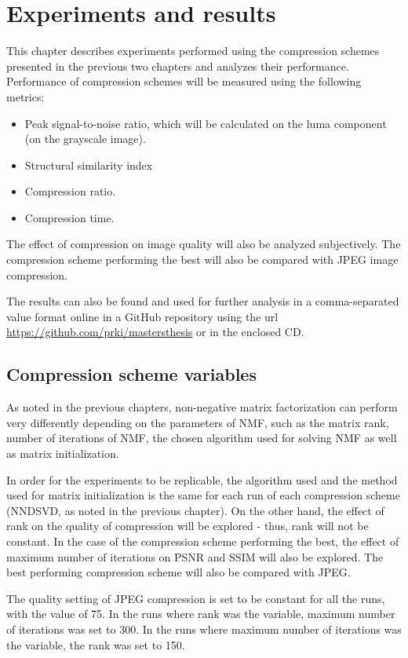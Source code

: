\documentclass[thesis=M,english]{FITthesis}[2012/10/20]
\begin{document}
\chapter{Experiments and results}
\label{ch:tests}
This chapter describes experiments performed using the compression schemes
presented in the previous two chapters and analyzes their performance. Performance of
compression schemes will be measured using the following metrics:
\begin{itemize}
  \item Peak signal-to-noise ratio, which will be calculated on the luma component
  (on the grayscale image).
  \item Structural similarity index
  \item Compression ratio.
  \item Compression time.
\end{itemize}
The effect of compression on image quality will also be analyzed subjectively.
The compression scheme performing the best will also be compared with JPEG image
compression.

The results can also be found and used for further analysis in a comma-separated
value format online in a GitHub repository using the url \url{https://github.com/prki/mastersthesis}
or in the enclosed CD.


\section{Compression scheme variables}
As noted in the previous chapters, non-negative matrix factorization can perform
very differently depending on the parameters of NMF, such as the matrix rank,
number of iterations of NMF, the chosen algorithm used for solving NMF as well
as matrix initialization.

In order for the experiments to be replicable, the algorithm used and the
method used for matrix initialization is the same for each run of each
compression scheme (NNDSVD, as noted in the previous chapter). On the other hand,
the effect of rank on the quality of compression will be explored - thus, rank will
not be constant. In the case of the compression scheme performing the best, the effect
of maximum number of iterations on PSNR and SSIM will also be explored. The best performing
compression scheme will also be compared with JPEG.

The quality setting of JPEG compression is set to be constant for all the runs, with the value
of 75. In the runs where rank was the variable, maximum number of iterations was set to
300. In the runs where maximum number of iterations was the variable, the rank was set
to 150.
\end{document}
